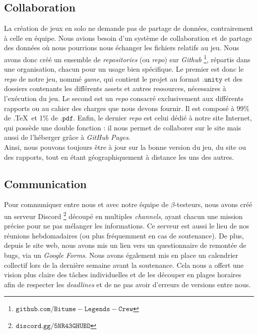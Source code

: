 \documentclass[12pt,a4paper]{article}
\begin{document}
        \subsection{Collaboration}
            La création de jeux en solo ne demande pas de partage de données, contrairement 
            à celle en équipe. Nous avions besoin d'un système de collaboration et de partage des données où nous 
            pourrions nous échanger les fichiers relatifs au jeu. 
            Nous avons donc créé un ensemble de \textit{repositories} (ou \textit{repo}) sur \textsl{Github}
            \footnote{\(\mathtt{github.com/Bitume-Legends-Crew}\)}, répartis dans une organisation,
            chacun pour un usage bien spécifique. Le premier est donc le \textit{repo} de
            notre jeu, nommé \textit{game}, qui contient le projet au format \(\mathtt{.unity}\)
            et des dossiers contenants les différents assets et autres ressources,
            nécessaires à l'exécution du jeu. 
            Le second est un \textit{repo} consacré exclusivement aux différents rapports ou au cahier des charges
            que nous devons fournir. Il est composé à 99\% de .\TeX\, et 1\% de \(\mathtt{.pdf}\).
            Enfin, le dernier \textit{repo} est celui dédié à notre site Internet, qui
            possède une double fonction : il nous permet de collaborer sur le site
            mais aussi de l'héberger grâce à \textsl{GitHub Pages}.\\
            \indent Ainsi, nous pouvons toujours être à jour sur la bonne version du jeu,
            du site ou des rapports, tout en étant géographiquement à distance les uns 
            des autres.
    
        \subsection{Communication}
            Pour communiquer entre nous et avec notre équipe de \(\beta\)-testeurs, nous
            avons créé un serveur Discord \footnote{\(\mathtt{discord.gg/5NR43GHUBD}\)}
            découpé en multiples 
            \textit{channels}, ayant chacun une mission précise pour ne pas mélanger les
            informations. Ce serveur est aussi le lieu de nos réunions hebdomadaires 
            (ou plus fréquemment en cas de soutenance). De plus, depuis le site web, nous
            avons mis un lien vers un questionnaire de remontée de bugs, via un \textsl{Google Forms}.
            Nous avons également mis en place un calendrier collectif lors de la
            dernière semaine avant la soutenance. Cela nous a offert une vision plus
            claire des tâches individuelles et de les découper en plages horaires afin de 
            respecter les \textit{deadlines} et de ne pas avoir d'erreurs de versions
            entre nous.
    
\end{document}
